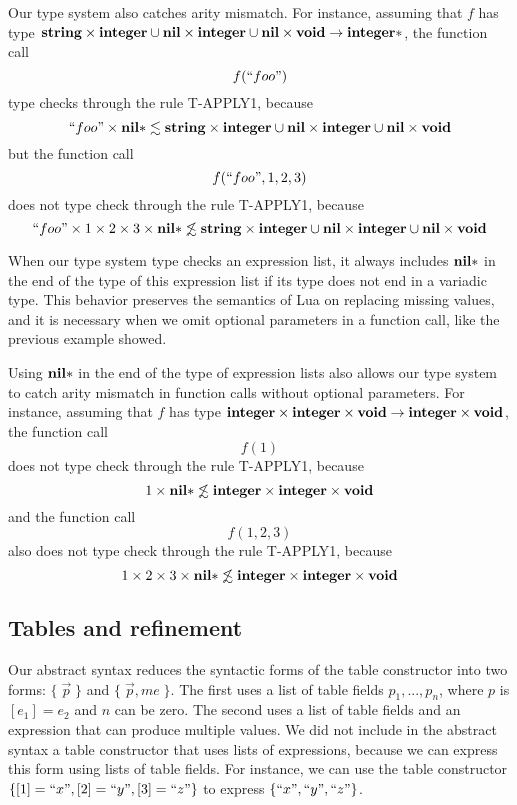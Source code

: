 Our type system also catches arity mismatch.
For instance, assuming that $f$ has type
$\mathbf{string} \times \mathbf{integer} \cup \mathbf{nil} \times \mathbf{integer} \cup \mathbf{nil} \times \mathbf{void} \rightarrow \mathbf{integer}{*}$,
the function call
\[
f(``foo")
\]
type checks through the rule \textsc{T-APPLY1}, because
\[
``foo" \times \mathbf{nil}{*} \lesssim \mathbf{string} \times \mathbf{integer} \cup \mathbf{nil} \times \mathbf{integer} \cup \mathbf{nil} \times \mathbf{void}
\]
but the function call
\[
f(``foo",1,2,3)
\]
does not type check through the rule \textsc{T-APPLY1}, because
\[
``foo" \times 1 \times 2 \times 3 \times \mathbf{nil}{*} \not\lesssim \mathbf{string} \times \mathbf{integer} \cup \mathbf{nil} \times \mathbf{integer} \cup \mathbf{nil} \times \mathbf{void}
\]

When our type system type checks an expression list,
it always includes $\mathbf{nil}{*}$ in the end of the type of this expression list
if its type does not end in a variadic type.
This behavior preserves the semantics of Lua on replacing missing values,
and it is necessary when we omit optional parameters in a function call,
like the previous example showed.

Using $\mathbf{nil}{*}$ in the end of the type of expression lists also allows
our type system to catch arity mismatch in function calls without optional parameters.
For instance, assuming that $f$ has type
$\mathbf{integer} \times \mathbf{integer} \times \mathbf{void} \rightarrow \mathbf{integer} \times \mathbf{void}$,
the function call
\[
f(1)
\]
does not type check through the rule \textsc{T-APPLY1}, because
\[
1 \times \mathbf{nil}{*} \not\lesssim \mathbf{integer} \times \mathbf{integer} \times \mathbf{void}
\]
and the function call
\[
f(1,2,3)
\]
also does not type check through the rule \textsc{T-APPLY1}, because
\[
1 \times 2 \times 3 \times \mathbf{nil}{*} \not\lesssim \mathbf{integer} \times \mathbf{integer} \times \mathbf{void}
\]

\subsection{Tables and refinement}
\label{sec:refinement}

Our abstract syntax reduces the syntactic forms of the table constructor
into two forms: $\{\;\vec{p}\;\}$ and $\{\;\vec{p},me\;\}$.
The first uses a list of table fields $p_{1}, ..., p_{n}$,
where $p$ is $[e_{1}] = e_{2}$ and $n$ can be zero.
The second uses a list of table fields and an expression that can
produce multiple values.
We did not include in the abstract syntax a table constructor that uses
lists of expressions, because we can express this form using lists of
table fields.
For instance, we can use the table constructor
$\{ [1] = ``x", [2] = ``y", [3] = ``z" \}$ to express $\{ ``x", ``y", ``z" \}$.

